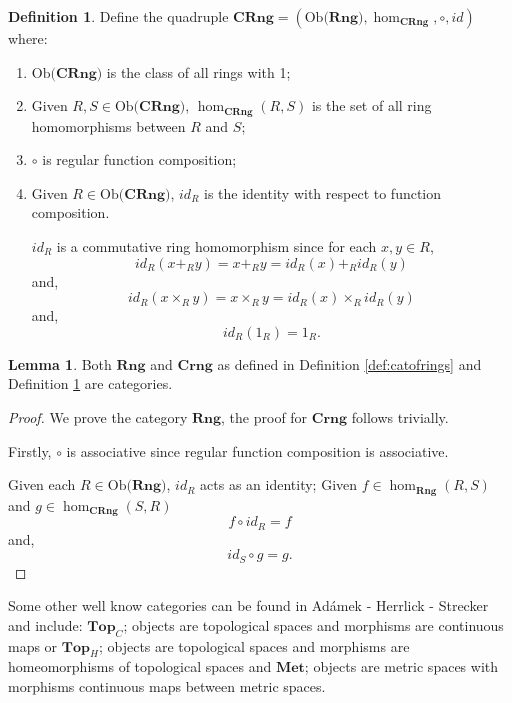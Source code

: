 \documentclass[11pt,a4paper]{article}
\theoremstyle{definition}
\newtheorem{lemma}[thm]{Lemma}
\newtheorem{definition}[thm]{Definition}
\newcommand\ho[3][]{\hom_{#1}(#2,#3)}
\newcommand\ob[1]{\mathrm{Ob(}#1\mathrm{)}}
\numberwithin{equation}{section}
\begin{document}
\begin{definition}
    \label{def:catofcrings}
    Define the quadruple $\mathbf{CRng}=(\ob{\mathbf{Rng}},\hom_{\mathbf{CRng}},\circ,id)$ where:
    \begin{enumerate}
    \item $\ob{\mathbf{CRng}}$ is the class of all rings with 1;
    \item Given $R,S\in \ob{\mathbf{CRng}}$, $\ho[\mathbf{CRng}]{R}{S}$ is the set of all ring homomorphisms between $R$ and $S$;
    \item $\circ$ is regular function composition;
    \item Given $R\in \ob{\mathbf{CRng}}$, $id_{R}$ is the identity with respect to function composition. 
    
    $id_{R}$ is a commutative ring homomorphism since for each $x,y\in R$,\[id_{R}(x+_{R}y)=x+_{R}y=id_{R}(x)+_{R}id_{R}(y)\] and, \[id_{R}(x\times_{R}y)=x\times_{R}y=id_{R}(x)\times_{R}id_{R}(y)\] and,
    \[id_{R}(1_{R})=1_{R}.\]
    \end{enumerate}
\end{definition}
\begin{lemma}
Both $\mathbf{Rng}$ and $\mathbf{Crng}$ as defined in Definition \ref{def:catofrings} and Definition \ref{def:catofcrings} are categories.
\end{lemma}
\begin{proof}
We prove the category $\mathbf{Rng}$, the proof for $\mathbf{Crng}$ follows trivially.

Firstly, $\circ$ is associative since regular function composition is associative. 

Given each $R\in\ob{\mathbf{Rng}}$, $id_{R}$ acts as an identity;
Given $f\in\ho[\mathbf{Rng}]{R}{S}$ and $g\in\ho[\mathbf{CRng}]{S}{R}$
\[f\circ id_{R} = f\]
and,
\[id_{S}\circ g = g.\]
\end{proof}

Some other well know categories can be found in Adámek - Herrlick - Strecker \cite{ACC} and include: $\mathbf{Top}_{C}$; objects are topological spaces and morphisms are continuous maps or $\mathbf{Top}_{H}$; objects are topological spaces and morphisms are homeomorphisms of topological spaces and $\mathbf{Met}$; objects are  metric spaces with morphisms continuous maps between metric spaces.
\end{document}
